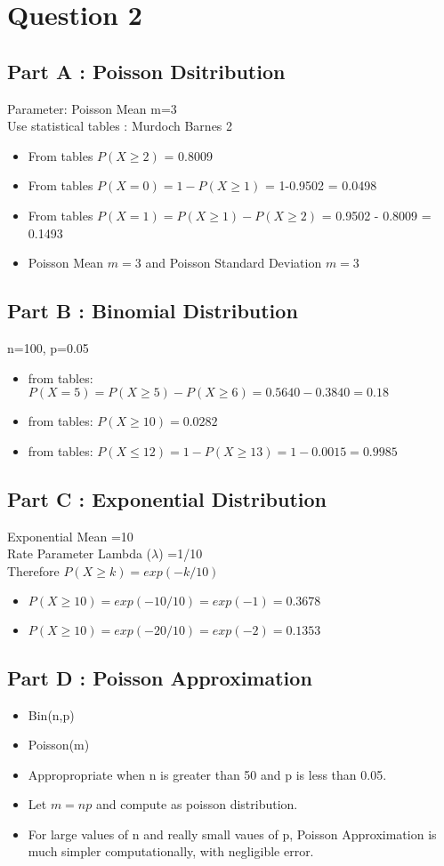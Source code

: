 \documentclass[]{article}
\begin{document}
\newpage
\section*{Question 2}
\subsection*{Part A : Poisson Dsitribution}
Parameter: Poisson Mean m=3\\
Use statistical tables : Murdoch Barnes 2\\
\begin{itemize}
\item From tables $P(X \geq 2)$ = 0.8009
\item From tables $P(X = 0) = 1-P(X \geq 1)$ = 1-0.9502 = 0.0498
\item From tables $P(X = 1) = P(X \geq 1) - P(X \geq 2) $ = 0.9502 - 0.8009 = 0.1493
\item Poisson Mean $m=3$  and Poisson Standard Deviation $m=3$
\end{itemize}
\subsection*{Part B : Binomial Distribution}
n=100, p=0.05
\begin{itemize}
\item from tables: $P(X=5) = P(X \geq 5) - P(X \geq 6) = 0.5640 - 0.3840 = 0.18$
\item from tables: $P(X \geq 10) = 0.0282$
\item from tables: $P(X \leq 12) = 1-P(X\geq 13) = 1- 0.0015 = 0.9985$
\end{itemize}
\subsection*{Part C : Exponential Distribution}
Exponential Mean =10\\
Rate Parameter Lambda ($\lambda$) =1/10\\
Therefore $P(X \geq k ) = exp(-k/10)$
\begin{itemize}
\item $P(X \geq 10 ) = exp(-10/10) = exp(-1) = 0.3678$
\item $P(X \geq 10 ) = exp(-20/10) = exp(-2) = 0.1353$
\end{itemize}

\subsection*{Part D : Poisson Approximation}
\begin{itemize}
\item Bin(n,p)
\item Poisson(m)
\item Appropropriate when n is greater than 50 and p is less than 0.05.
\item Let $m = np$ and compute as poisson distribution.
\item For large values of n and really small vaues of p, Poisson Approximation is much simpler computationally, with negligible error.
\end{itemize}
\newpage
\end{document}
